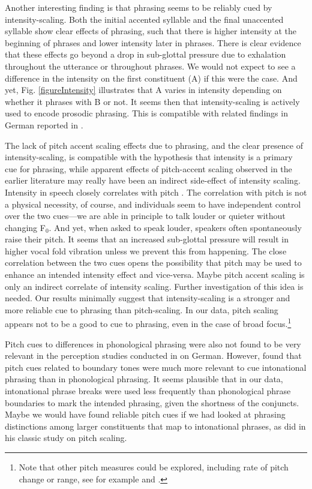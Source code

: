 \documentclass[preprint,review,12pt,authoryear,times]{elsarticle}
\begin{document}
Another interesting finding is that phrasing seems to be reliably cued by intensity-scaling. Both the initial accented syllable and the final unaccented syllable show clear effects of phrasing, such that there is higher intensity at the beginning of phrases and lower intensity later in phrases. There is clear evidence that these effects go beyond a drop in sub-glottal pressure due to exhalation throughout the utterance or throughout phrases. We would not expect to see a difference in the intensity on the first constituent (A) if this were the case. And yet, Fig. \ref{figureIntensity} illustrates that A varies in intensity depending on whether it phrases with B or not. It seems then that intensity-scaling is actively used to encode prosodic phrasing. This is compatible with related findings in German reported in \citet{poschmannwagner16}.  

The lack of pitch accent scaling effects due to phrasing, and the clear presence of intensity-scaling, is compatible with the hypothesis that intensity is a primary cue for phrasing, while apparent effects of pitch-accent scaling observed in the earlier literature may really have been an indirect side-effect of intensity scaling.  Intensity in speech closely correlates with pitch \citep{gramm88}. The correlation with pitch is not a physical necessity, of course, and individuals seem to have independent control over the two cues---we are able in principle to talk louder or quieter without changing F$_0$.  And yet, when asked to speak louder, speakers often spontaneously raise their pitch. It seems that an increased sub-glottal pressure will result in higher vocal fold vibration unless we prevent this from happening. The close correlation between the two cues opens the possibility that pitch may be used to enhance an intended intensity effect and vice-versa. Maybe pitch accent scaling is only an indirect correlate of intensity scaling. Further investigation of this idea is needed. Our results minimally suggest that intensity-scaling is a stronger and more reliable cue to phrasing than pitch-scaling. In our data, pitch scaling appears not to be a good to cue to phrasing, even in the case of broad focus.\footnote{Note that other pitch measures could be explored, including rate of pitch change or range, see for example \citet{rietv85} and \citet{hart90}.}

Pitch cues to differences in phonological phrasing were also not found to be very relevant in the perception studies conducted in \citet{gollr13} on German.  However, \citet{gollr13} found that pitch cues related to boundary tones were much more relevant to cue intonational phrasing than in phonological phrasing. It seems plausible that in our data, intonational phrase breaks were used less frequently than phonological phrase boundaries to mark the intended phrasing, given the shortness of the conjuncts. Maybe we would have found reliable pitch cues if we had looked at phrasing distinctions among larger constituents that map to intonational phrases, as \citet{ladd88} did in his classic study on pitch scaling. 
\end{document}
